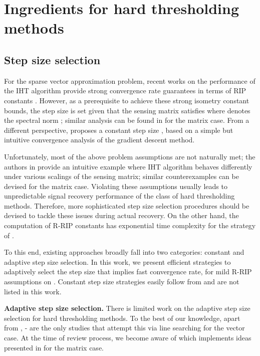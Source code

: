\documentclass[twocolumn]{svjour3}
\begin{document}
\section{Ingredients for hard thresholding methods}{\label{section:ingredients}}

\subsection{Step size selection}

For the sparse vector approximation problem, recent works on the performance of the IHT algorithm provide strong convergence rate guarantees in terms of RIP constants \cite{Blumensath_iterativehard}. However, as a prerequisite to achieve these strong isometry constant bounds, the step size is set  given that the sensing matrix satisfies  where  denotes the spectral norm \cite{HTP}; similar analysis can be found in \cite{SVP} for the matrix case. From a different perspective, \cite{garg2009gradient} proposes a constant step size , based on a simple but intuitive convergence analysis of the gradient descent method. 

Unfortunately, most of the above problem assumptions are not naturally met; the authors in \cite{NIHT} provide an intuitive example where IHT algorithm behaves differently under various scalings of the sensing matrix; similar counterexamples can be devised for the matrix case. Violating these assumptions usually leads to unpredictable signal recovery performance of the class of hard thresholding methods. 
Therefore, more sophisticated step size selection procedures should be devised to tackle these issues during actual recovery. On the other hand, the computation of R-RIP constants has exponential time complexity for the strategy of \cite{SVP}. 

To this end, existing approaches broadly fall into two categories: constant and adaptive step size selection. In this work, we present efficient strategies to adaptively select the step size  that implies fast convergence rate, for mild R-RIP assumptions on . Constant step size strategies easily follow from \cite{KyrillidisCevherRecipes} and are not listed in this work. 

\textbf{Adaptive step size selection.} 
There is limited work on the adaptive step size selection for hard thresholding methods. To the best of our knowledge, apart from \cite{KyrillidisCevherRecipes}, \cite{NIHT}-\cite{AIHT} are the only studies that attempt this via line searching for the vector case. At the time of review process, we become aware of \cite{tannernormalized} which implements ideas presented in \cite{NIHT} for the matrix case.
\end{document}
